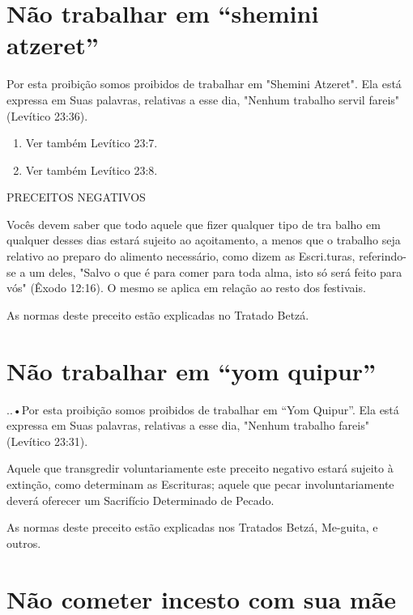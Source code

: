 \section{Não trabalhar em ``shemini atzeret''}

Por esta proibição somos proibidos de trabalhar em "Shemini Atze­ret".
Ela está expressa em Suas palavras, relativas a esse dia, "Nenhum
trabalho servil fareis" (Levítico 23:36).


\begin{enumerate}
\def\labelenumi{\arabic{enumi}.}
\setcounter{enumi}{439}
\item
 
 Ver também Levítico 23:7.
 
\item
 
 Ver também Levítico 23:8.
 
\end{enumerate}


PRECEITOS NEGATIVOS

Vocês devem saber que todo aquele que fizer qualquer tipo de tra balho
em qualquer desses dias estará sujeito ao açoitamento, a menos que o
trabalho seja relativo ao preparo do alimento necessário, como dizem as
Escri­.turas, referindo-se a um deles, "Salvo o que é
para comer para toda alma, isto só será feito para vós" (Êxodo 12:16). O
mesmo se aplica em relação ao resto dos festivais.

As normas deste preceito estão explicadas no Tratado Betzá.


\section{Não trabalhar em ``yom quipur''}


..•Por esta proibição somos proibidos de trabalhar em
``Yom Quipur''. Ela está expressa em Suas palavras, relativas a esse dia,
"Nenhum trabalho fa­reis" (Levítico 23:31).

Aquele que transgredir voluntariamente este preceito negativo esta­rá
sujeito à extinção, como determinam as Escrituras; aquele que pecar
invo­luntariamente deverá oferecer um Sacrifício Determinado de Pecado.

As normas deste preceito estão explicadas nos Tratados Betzá, Me-guita,
e outros.

\section{Não cometer incesto com sua mãe}

